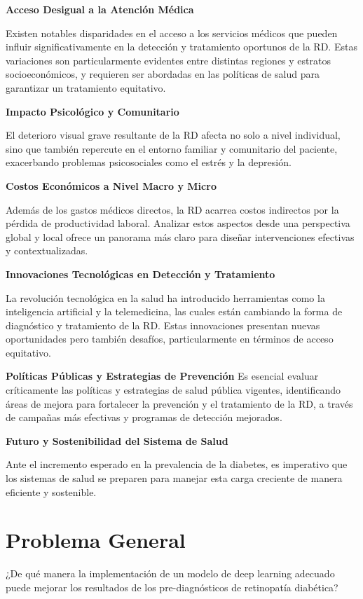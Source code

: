 \textbf{Acceso Desigual a la Atención Médica}

Existen notables disparidades en el acceso a los servicios médicos que pueden influir significativamente en la detección y tratamiento oportunos de la RD. Estas variaciones son particularmente evidentes entre distintas regiones y estratos socioeconómicos, y requieren ser abordadas en las políticas de salud para garantizar un tratamiento equitativo.

\textbf{Impacto Psicológico y Comunitario}

El deterioro visual grave resultante de la RD afecta no solo a nivel individual, sino que también repercute en el entorno familiar y comunitario del paciente, exacerbando problemas psicosociales como el estrés y la depresión.

\textbf{Costos Económicos a Nivel Macro y Micro}

Además de los gastos médicos directos, la RD acarrea costos indirectos por la pérdida de productividad laboral. Analizar estos aspectos desde una perspectiva global y local ofrece un panorama más claro para diseñar intervenciones efectivas y contextualizadas.

\textbf{Innovaciones Tecnológicas en Detección y Tratamiento}

La revolución tecnológica en la salud ha introducido herramientas como la inteligencia artificial y la telemedicina, las cuales están cambiando la forma de diagnóstico y tratamiento de la RD. Estas innovaciones presentan nuevas oportunidades pero también desafíos, particularmente en términos de acceso equitativo.

\textbf{Políticas Públicas y Estrategias de Prevención}
Es esencial evaluar críticamente las políticas y estrategias de salud pública vigentes, identificando áreas de mejora para fortalecer la prevención y el tratamiento de la RD, a través de campañas más efectivas y programas de detección mejorados.

\textbf{Futuro y Sostenibilidad del Sistema de Salud}

Ante el incremento esperado en la prevalencia de la diabetes, es imperativo que los sistemas de salud se preparen para manejar esta carga creciente de manera eficiente y sostenible.

\section{Problema General}
\newcommand{\ProblemaGeneral}{
	¿De qué manera la implementación de un modelo de deep learning adecuado puede mejorar los resultados de los pre-diagnósticos de retinopatía diabética?
}
\ProblemaGeneral

